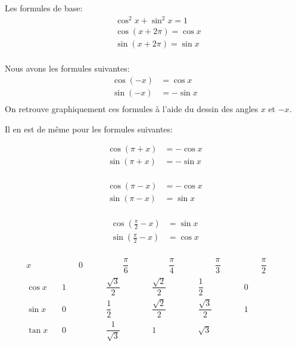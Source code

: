 \documentclass[class=report,crop=false]{standalone}
\begin{document}
Les formules de base:
\begin{align*}
& \cos^2 x + \sin^2 x = 1 \\
& \cos(x+2\pi)=\cos x \\
& \sin(x+2\pi)=\sin x \\
\end{align*}

\begin{minipage}{0.45\textwidth}
\end{minipage}
\begin{minipage}{0.42\textwidth}
Nous avons les formules suivantes:
\begin{align*}
\cos (-x) &= \cos x \\
\sin (-x) &= -\sin x \\
\end{align*}
On retrouve graphiquement ces formules à l'aide du dessin des angles $x$ et $-x$.
\end{minipage}

Il en est de même pour les formules suivantes:

\begin{minipage}{0.32\textwidth}
\begin{align*}
\cos (\pi + x) &= -\cos x \\
\sin (\pi + x) &= -\sin x \\
\end{align*}
\end{minipage}
\begin{minipage}{0.32\textwidth}
\begin{align*}
\cos (\pi - x) &= -\cos x \\
\sin (\pi - x) &= \sin x \\
\end{align*}
\end{minipage}
\begin{minipage}{0.32\textwidth}
\begin{align*}
\cos (\frac\pi2 - x) &= \sin x \\
\sin (\frac\pi2 - x) &= \cos x \\
\end{align*}
\end{minipage}


{
\renewcommand{\arraystretch}{3}
$$
\begin{array}{c|*{5}{c}}
    x     & \qquad 0 \qquad & \qquad \dfrac\pi6 \qquad & \qquad \dfrac\pi 4\qquad
& \qquad \dfrac \pi 3\qquad  &\qquad  \dfrac \pi 2\qquad  \\
\hline
\cos x  \quad & 1 & \dfrac{\sqrt3}{2} & \dfrac{\sqrt2}{2} & \dfrac12 & 0 \\
\hline
\sin x  \quad & 0 &\dfrac12 & \dfrac{\sqrt2}{2} & \dfrac{\sqrt3}{2} & 1\\
\hline
\tan x  \ & 0 & \dfrac{1}{\sqrt{3}} & 1 & \sqrt{3} &
\end{array}
$$
}
\end{document}
